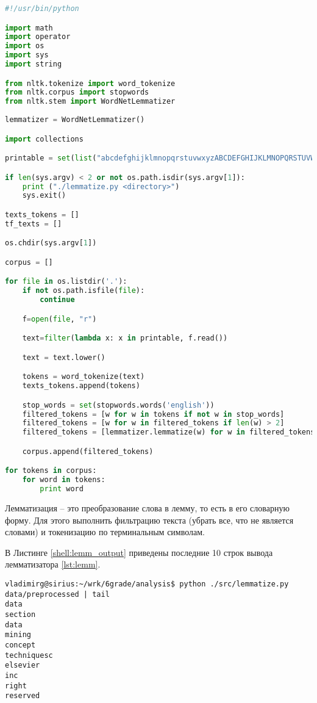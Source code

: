 \documentclass[12pt, a4paper] {article}
\begin{document}
\begin{lstlisting}[language=Python,caption=Исходный код лемматизатора,label=lst:lemm]
#!/usr/bin/python

import math
import operator
import os
import sys 
import string

from nltk.tokenize import word_tokenize
from nltk.corpus import stopwords
from nltk.stem import WordNetLemmatizer 
  
lemmatizer = WordNetLemmatizer() 

import collections

printable = set(list("abcdefghijklmnopqrstuvwxyzABCDEFGHIJKLMNOPQRSTUVWXYZ ")) 

if len(sys.argv) < 2 or not os.path.isdir(sys.argv[1]):
    print ("./lemmatize.py <directory>")
    sys.exit()

texts_tokens = []
tf_texts = []

os.chdir(sys.argv[1])

corpus = []

for file in os.listdir('.'):
    if not os.path.isfile(file):
        continue

    f=open(file, "r")

    text=filter(lambda x: x in printable, f.read())

    text = text.lower()

    tokens = word_tokenize(text)
    texts_tokens.append(tokens)

    stop_words = set(stopwords.words('english'))
    filtered_tokens = [w for w in tokens if not w in stop_words] 
    filtered_tokens = [w for w in filtered_tokens if len(w) > 2]
    filtered_tokens = [lemmatizer.lemmatize(w) for w in filtered_tokens]

    corpus.append(filtered_tokens)

for tokens in corpus:
    for word in tokens:
        print word
\end{lstlisting}

Лемматизация -- это преобразование слова в лемму, то есть в его словарную форму. Для этого выполнить фильтрацию текста (убрать все, что не является словами) и токенизацию по терминальным символам.

В Листинге \ref{shell:lemm_output} приведены последние 10 строк вывода лемматизатора \ref{lst:lemm}.

\begin{lstlisting}[label=shell:lemm_output,caption=Первые строки вывода лемматизатора]
vladimirg@sirius:~/wrk/6grade/analysis$ python ./src/lemmatize.py data/preprocessed | tail
data
section
data
mining
concept
techniquesc
elsevier
inc
right
reserved
\end{lstlisting}
\end{document}
